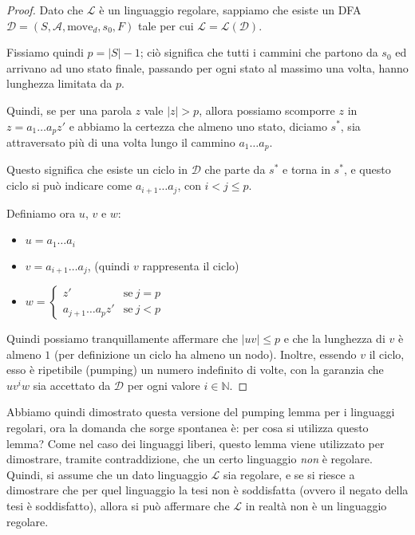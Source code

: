 \documentclass[class=book, crop=false, oneside, 12pt]{standalone}
\begin{document}
\begin{proof}
    Dato che \(\mathcal{L}\) è un linguaggio regolare, sappiamo che esiste un DFA \(\mathcal{D} = (S,\mathcal{A},\textrm{move}_d ,s_0, F)\) tale per cui \(\mathcal{L} = \mathcal{L}(\mathcal{D})\).

    Fissiamo quindi \(p=|S|-1\); ciò significa che tutti i cammini che partono da \(s_0\) ed arrivano ad uno stato finale, passando per ogni stato al massimo una volta, hanno lunghezza limitata da \(p\).

    Quindi, se per una parola \(z\) vale \(|z|>p\), allora possiamo scomporre \(z\) in \(z = a_1 \dots a_p z'\) e abbiamo la certezza che almeno uno stato, diciamo \(s^\ast\), sia attraversato più di una volta lungo il cammino \(a_1 \dots a_p\).

    Questo significa che esiste un ciclo in \(\mathcal{D}\) che parte da \(s^\ast\) e torna in \(s^\ast\), e questo ciclo si può indicare come \(a_{i+1} \dots a_j\), con \(i<j\le p\).

    Definiamo ora \(u\), \(v\) e \(w\):
    \begin{itemize}
        \item \(u = a_1 \dots a_i\)
        \item \(v = a_{i+1} \dots a_j\),  (quindi \(v\) rappresenta il ciclo)
        \item \(w = 
        \begin{cases}
            z'                   & \textrm{se} \ j = p\\ 
            a_{j+1} \dots a_pz'  & \textrm{se} \ j < p
        \end{cases}\)
    \end{itemize}

    Quindi possiamo tranquillamente affermare che \(|uv| \le p\) e che la lunghezza di \(v\) è almeno \(1\) (per definizione un ciclo ha almeno un nodo). Inoltre, essendo \(v\) il ciclo, esso è ripetibile (pumping) un numero indefinito di volte, con la garanzia che \(uv^iw\) sia accettato da \(\mathcal{D}\) per ogni valore \(i \in \mathbb{N}\). 
\end{proof}
Abbiamo quindi dimostrato questa versione del pumping lemma per i linguaggi regolari, ora la domanda che sorge spontanea è: per cosa si utilizza questo lemma? Come nel caso dei linguaggi liberi, questo lemma viene utilizzato per dimostrare, tramite contraddizione, che un certo linguaggio \emph{non} è regolare. Quindi, si assume che un dato linguaggio \(\mathcal{L}\) sia regolare, e se si riesce a dimostrare che per quel linguaggio la tesi non è soddisfatta (ovvero il negato della tesi è soddisfatto), allora si può affermare che \(\mathcal{L}\) in realtà non è un linguaggio regolare.
\end{document}
